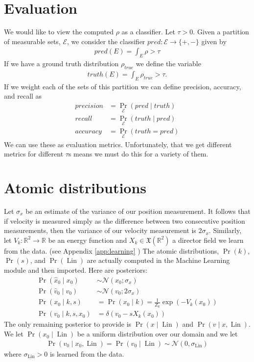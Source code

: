 \documentclass[12pt]{amsart}
\DeclareMathOperator{\Lin}{Lin}
\begin{document}
\section{Evaluation}
We would like to view the computed $\rho$ as a classifier.
Let $\tau > 0$. Given a partition of measurable sets, $\mathcal{E}$, we consider the classifier $pred: \mathcal{E} \to \{ +, - \}$ given by
\begin{align*}
	pred(E) = \int_E \rho  > \tau
\end{align*}
If we have a ground truth distribution $\rho_{true}$ we define the variable
\begin{align*}
	truth(E) = \int_E \rho_{true} > \tau.
\end{align*}
If we weight each of the sets of this partition we can define precision, accuracy, and recall as
\begin{align*}
	precision &= \Pr_{\mathcal{E}} ( pred \mid truth ) \\
	recall &= \Pr_{\mathcal{E}} ( truth \mid  pred ) \\
	accuracy &= \Pr_{\mathcal{E}}( truth = pred )
\end{align*}
We can use these as evaluation metrics.  Unfortunately, that we get different metrics for different $\tau$s means we must do this for a variety of them.

\appendix

\section{Atomic distributions}
Let $\sigma_x$ be an estimate of the variance of our position measurement.
It follows that if velocity is measured simply as the difference between two consecutive position measurements, then the variance of our velocity measurement is $2 \sigma_x$.
Similarly, let $V_k: \mathbb{R}^2 \to \mathbb{R}$ be an energy function and $X_k \in \mathfrak{X}( \mathbb{R}^2)$ a director field we learn from the data. (see Appendix \ref{app:learning} )
The atomic distributions, $\Pr(k)$, $\Pr(s)$, and $\Pr(\Lin)$ are actually computed in the Machine Learning module and then imported.
Here are posteriors:
\begin{align*}
	\Pr( \hat{x}_0 \mid x_0 ) &\sim \mathcal{N}( x_0 ; \sigma_x ) \\
	\Pr( \hat{v}_0 \mid v_0 ) &\sim \mathcal{N}( v_0 ; 2\sigma_x ) \\
	\Pr( x_0 \mid k,s ) &= \Pr(x_0 \mid k) = \frac{1}{Z_k} \exp \left( -V_k( x_0 ) \right) \\
	\Pr( v_0 \mid k,s,x_0) &= \delta( v_0 - s X_k(x_0) )
\end{align*}
The only remaining posterior to provide is $\Pr( x \mid \Lin )$ and $\Pr( v \mid x,\Lin )$.
We let $\Pr( x_0 \mid \Lin)$ be a uniform distribution over our domain and we let
\begin{align}
	\Pr( v_0 \mid x_0 , \Lin ) = \Pr( v_0 \mid \Lin ) \sim \mathcal{N}( 0, \sigma_{\Lin} ) \label{eq:v given x and Linear}
\end{align}
where $\sigma_{\Lin} > 0$ is learned from the data.
\end{document}
